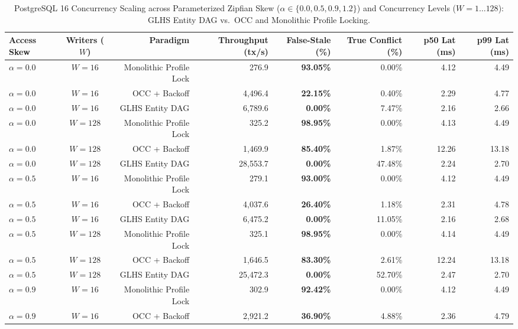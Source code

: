 \begin{table}[t]
\centering
\small
\caption{PostgreSQL 16 Concurrency Scaling across Parameterized Zipfian Skew ($\alpha \in \{0.0, 0.5, 0.9, 1.2\}$) and Concurrency Levels ($W=1\dots128$): GLHS Entity DAG vs.\ OCC and Monolithic Profile Locking.}
\label{tab:glhs_zipfian_concurrency}
\begin{tabular}{lcrrrrrr}
\toprule
\textbf{Access Skew} & \textbf{Writers ($W$)} & \textbf{Paradigm} & \textbf{Throughput (tx/s)} & \textbf{False-Stale (\%)} & \textbf{True Conflict (\%)} & \textbf{p50 Lat (ms)} & \textbf{p99 Lat (ms)} \\
\midrule
$\alpha = 0.0$ & $W = 16$ & Monolithic Profile Lock & 276.9 & \textbf{93.05\%} & 0.00\% & 4.12 & 4.49 \\
$\alpha = 0.0$ & $W = 16$ & OCC + Backoff & 4,496.4 & \textbf{22.15\%} & 0.40\% & 2.29 & 4.77 \\
$\alpha = 0.0$ & $W = 16$ & GLHS Entity DAG & 6,789.6 & \textbf{0.00\%} & 7.47\% & 2.16 & 2.66 \\
\midrule
$\alpha = 0.0$ & $W = 128$ & Monolithic Profile Lock & 325.2 & \textbf{98.95\%} & 0.00\% & 4.13 & 4.49 \\
$\alpha = 0.0$ & $W = 128$ & OCC + Backoff & 1,469.9 & \textbf{85.40\%} & 1.87\% & 12.26 & 13.18 \\
$\alpha = 0.0$ & $W = 128$ & GLHS Entity DAG & 28,553.7 & \textbf{0.00\%} & 47.48\% & 2.24 & 2.70 \\
\midrule
$\alpha = 0.5$ & $W = 16$ & Monolithic Profile Lock & 279.1 & \textbf{93.00\%} & 0.00\% & 4.12 & 4.49 \\
$\alpha = 0.5$ & $W = 16$ & OCC + Backoff & 4,037.6 & \textbf{26.40\%} & 1.18\% & 2.31 & 4.78 \\
$\alpha = 0.5$ & $W = 16$ & GLHS Entity DAG & 6,475.2 & \textbf{0.00\%} & 11.05\% & 2.16 & 2.68 \\
\midrule
$\alpha = 0.5$ & $W = 128$ & Monolithic Profile Lock & 325.1 & \textbf{98.95\%} & 0.00\% & 4.14 & 4.49 \\
$\alpha = 0.5$ & $W = 128$ & OCC + Backoff & 1,646.5 & \textbf{83.30\%} & 2.61\% & 12.24 & 13.18 \\
$\alpha = 0.5$ & $W = 128$ & GLHS Entity DAG & 25,472.3 & \textbf{0.00\%} & 52.70\% & 2.47 & 2.70 \\
\midrule
$\alpha = 0.9$ & $W = 16$ & Monolithic Profile Lock & 302.9 & \textbf{92.42\%} & 0.00\% & 4.12 & 4.49 \\
$\alpha = 0.9$ & $W = 16$ & OCC + Backoff & 2,921.2 & \textbf{36.90\%} & 4.88\% & 2.36 & 4.79 \\

\end{tabular}
\end{table}
